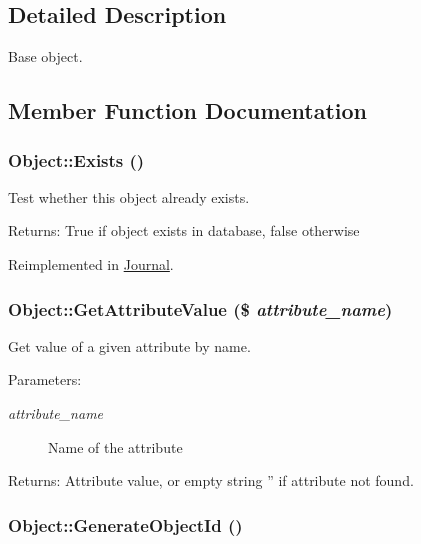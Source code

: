 \subsection{Detailed Description}
Base object. 

\subsection{Member Function Documentation}
\hypertarget{class_object_740e3ddfc03f8d18826fe6ed67344f0f}{
\subsubsection{\setlength{\rightskip}{0pt plus 5cm}Object::Exists ()}}
\label{class_object_740e3ddfc03f8d18826fe6ed67344f0f}


Test whether this object already exists. 

\begin{Desc}
\item[Returns:]True if object exists in database, false otherwise \end{Desc}


Reimplemented in \hyperlink{class_journal_972ce1a8531e15757579826aca9f8e49}{Journal}.\hypertarget{class_object_09d42d8bd63d8d7f9353b5087301b81c}{
\subsubsection{\setlength{\rightskip}{0pt plus 5cm}Object::GetAttributeValue (\$ {\em attribute\_\-name})}}
\label{class_object_09d42d8bd63d8d7f9353b5087301b81c}


Get value of a given attribute by name. 

\begin{Desc}
\item[Parameters:]
\begin{description}
\item[{\em attribute\_\-name}]Name of the attribute\end{description}
\end{Desc}
\begin{Desc}
\item[Returns:]Attribute value, or empty string '' if attribute not found. \end{Desc}
\hypertarget{class_object_291597e1743bd57c40b8b49ae676e940}{
\subsubsection{\setlength{\rightskip}{0pt plus 5cm}Object::GenerateObjectId ()}}
\label{class_object_291597e1743bd57c40b8b49ae676e940}


